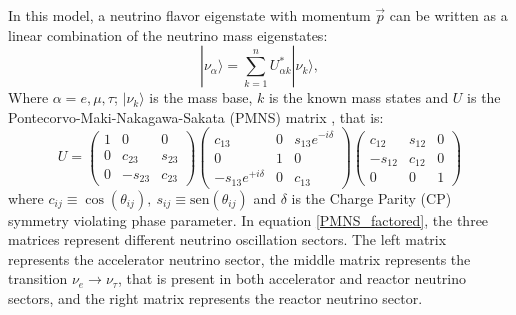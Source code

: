 In this model, a neutrino flavor eigenstate with momentum $\vec{p}$ can be written as a linear combination of the neutrino mass eigenstates:
%
\begin{equation}
	|\nu_\alpha \rangle = \sum_{k=1}^n U^*_{\alpha k} |\nu_k \rangle,
	\label{nu_state}
\end{equation}
%
Where $\alpha = e, \mu, \tau$; $|\nu_k\rangle$ is the mass base, $k$ is the known mass states and $U$ is the Pontecorvo-Maki-Nakagawa-Sakata (PMNS) matrix \cite{MNS, PMNS}, that is:
%
\begin{equation}
	U = \left( \begin{array}{ccc} 
	1 & 0 & 0 \\ 
	0 & c_{23} & s_{23} \\
	0 & -s_{23} & c_{23} \end{array} \right)
	\left(\begin{array}{ccc} 
	c_{13} & 0 & s_{13}e^{-i\delta} \\ 
	0 & 1 & 0 \\ 
	-s_{13}e^{+i\delta} & 0 & c_{13} \end{array}\right)
	\left(\begin{array}{ccc}
	c_{12} & s_{12} & 0 \\ 
	-s_{12} & c_{12} & 0 \\ 
	0 & 0 & 1 \end{array} \right)
	\label{PMNS_factored}
\end{equation}
%
where $c_{ij} \equiv \cos(\theta_{ij}), \ s_{ij} \equiv \text{sen}(\theta_{ij})$ and $\delta$ is the Charge Parity (CP) symmetry violating phase parameter.
In equation \ref{PMNS_factored}, the three matrices represent different neutrino oscillation sectors. The left matrix represents the accelerator neutrino sector, the middle matrix represents the transition $\nu_e \rightarrow \nu_\tau$, that is present in both accelerator and reactor neutrino sectors, and the right matrix represents the reactor neutrino sector.

